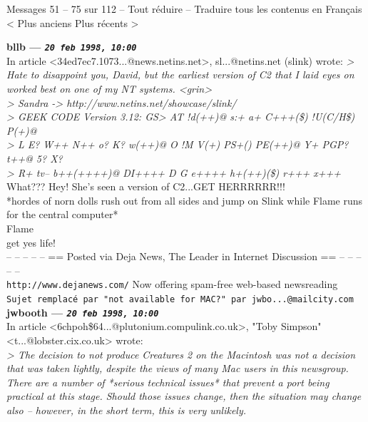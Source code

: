 \documentclass[11pt,twoside,a4paper]{article}
\begin{document}
\begin{multicols*}{2}
	
	  	Messages 51 -- 75 sur 112 -- Tout r{\'e}duire  --  Traduire tous les contenus en Fran\c{c}ais 	< Plus anciens  Plus r{\'e}cents >
	
		
\textbf{bllb --- \emph{\texttt{20 feb 1998, 10:00}}}~\\

In article <34ed7ec7.1073...@news.netins.net>, sl...@netins.net (slink) wrote:
\emph{> Hate to disappoint you, David, but the earliest version of C2 that I laid eyes on worked best on one of my NT systems.  <grin>}~\\
\emph{> Sandra -> http://www.netins.net/showcase/slink/}~\\
\emph{> GEEK CODE Version 3.12: GS> AT !d(++)@ s:+ a+ C+++(\$) !U(C/H\$) P(+)@}~\\
\emph{> L E? W++ N++ o? K? w(++)@ O !M V(+) PS+() PE(++)@ Y+ PGP? t++@ 5? X?}~\\
\emph{> R+ tv-- b++(++++)@ DI++++ D G e++++ h+(++)(\$) r+++ x+++}~\\

What??? Hey! She's seen a version of C2...GET HERRRRRR!!!~\\

*hordes of norn dolls rush out from all sides and jump on Slink while Flame runs for the central computer*~\\

Flame~\\
get yes life!~\\

-- -- -- -- -- == Posted via Deja News, The Leader in Internet Discussion == -- -- -- -- --~\\ 
\texttt{http://www.dejanews.com/}   Now offering spam-free web-based newsreading~\\

 
		
	
		
\texttt{Sujet remplac{\'e} par "not available for MAC?" par jwbo...@mailcity.com}~\\
		
	
		
\textbf{jwbooth --- \emph{\texttt{20 feb 1998, 10:00}}}~\\

In article <6chpoh\$64...@plutonium.compulink.co.uk>, "Toby Simpson" <t...@lobster.cix.co.uk> wrote:~\\
\emph{> The decision to not produce Creatures 2 on the Macintosh was not a decision that was taken lightly, despite the views of many Mac users in this newsgroup. There are a number of *serious technical issues* that prevent a port being practical at this stage. Should those issues change, then the situation may change also -- however, in the short term, this is very unlikely.}


\end{multicols*}
\end{document}
